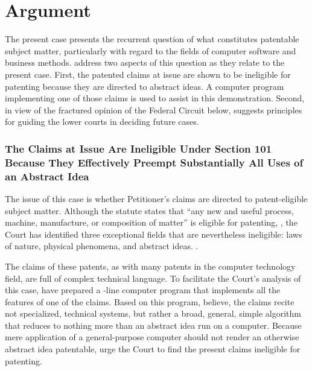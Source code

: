 \documentclass{scotus}
\begin{document}
\part{Argument}

The present case presents the recurrent question of what constitutes patentable
subject matter, particularly with regard to the fields of computer software and
business methods. \Amici address two aspects of this question as they relate to
the present case. First, the patented claims at issue are shown to be ineligible
for patenting because they are directed to abstract ideas. A computer program
implementing one of those claims is used to assist in this demonstration.
Second, in view of the fractured opinion of the Federal Circuit below, \amici
suggests principles for guiding the lower courts in deciding future cases.



%
%
\section{The Claims at Issue Are Ineligible Under Section 101 Because They
Effectively Preempt Substantially All Uses of an Abstract Idea}

The issue of this case is whether Petitioner's claims are directed to
patent-eligible subject matter. Although the statute states that ``any new and
useful process, machine, manufacture, or composition of matter'' is eligible for
patenting, , the Court has identified three exceptional fields that
are nevertheless ineligible: laws of nature, physical phenomena, and abstract
ideas. .

The claims of these patents, as with many patents in the computer technology
field, are full of complex technical language. To facilitate the Court's
analysis of this case, \amici have prepared a \numlines-line computer program
that implements all the features of one of the claims. Based on this program,
\amici believe, the claims recite not specialized, technical systems, but
rather a broad, general, simple algorithm that reduces to nothing more than an
abstract idea run on a computer. Because mere application of a general-purpose
computer should not render an otherwise abstract idea patentable, \amici
urge the Court to find the present claims ineligible for patenting.
\end{document}
